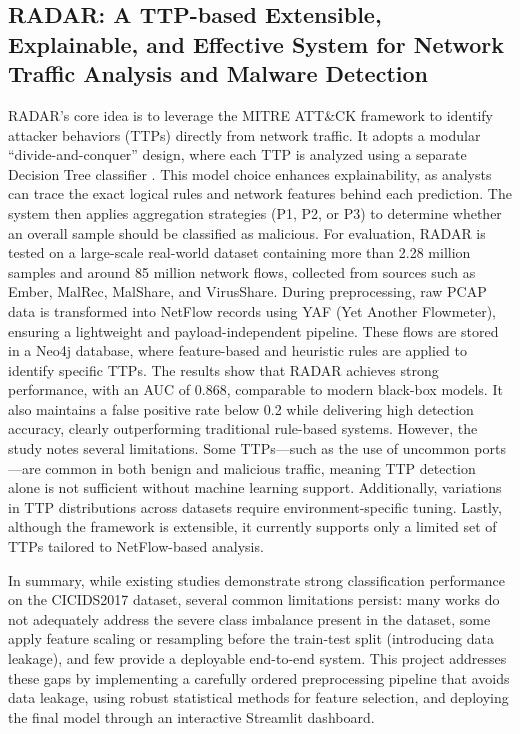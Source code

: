 \documentclass[12pt, a4paper]{article}
\begin{document}
\subsection*{RADAR: A TTP-based Extensible, Explainable, and Effective System for Network Traffic Analysis and Malware Detection}
RADAR’s core idea is to leverage the MITRE ATT\&CK framework to identify attacker behaviors (TTPs) directly from network traffic. It adopts a modular “divide-and-conquer” design, where each TTP is analyzed using a separate Decision Tree classifier \cite{radar}. This model choice enhances explainability, as analysts can trace the exact logical rules and network features behind each prediction. The system then applies aggregation strategies (P1, P2, or P3) to determine whether an overall sample should be classified as malicious. For evaluation, RADAR is tested on a large-scale real-world dataset containing more than 2.28 million samples and around 85 million network flows, collected from sources such as Ember, MalRec, MalShare, and VirusShare. During preprocessing, raw PCAP data is transformed into NetFlow records using YAF (Yet Another Flowmeter), ensuring a lightweight and payload-independent pipeline. These flows are stored in a Neo4j database, where feature-based and heuristic rules are applied to identify specific TTPs. The results show that RADAR achieves strong performance, with an AUC of 0.868, comparable to modern black-box models. It also maintains a false positive rate below 0.2 while delivering high detection accuracy, clearly outperforming traditional rule-based systems. However, the study notes several limitations. Some TTPs—such as the use of uncommon ports—are common in both benign and malicious traffic, meaning TTP detection alone is not sufficient without machine learning support. Additionally, variations in TTP distributions across datasets require environment-specific tuning. Lastly, although the framework is extensible, it currently supports only a limited set of TTPs tailored to NetFlow-based analysis. 

\medskip
\noindent
In summary, while existing studies demonstrate strong classification performance on the CICIDS2017 dataset, several common limitations persist: many works do not adequately address the severe class imbalance present in the dataset, some apply feature scaling or resampling before the train-test split (introducing data leakage), and few provide a deployable end-to-end system.
This project addresses these gaps by implementing a carefully ordered preprocessing pipeline that avoids data leakage, using robust statistical methods for feature selection, and deploying the final model through an interactive Streamlit dashboard.
\end{document}

